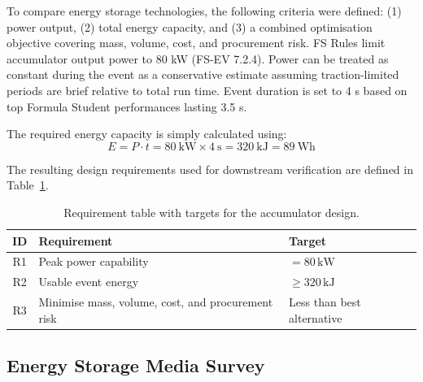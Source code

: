 To compare energy storage technologies, the following criteria were defined: (1) power output, (2) total energy capacity, and (3) a combined optimisation objective covering mass, volume, cost, and procurement risk.
FS Rules limit accumulator output power to 80 kW (FS-EV 7.2.4). Power can be treated as constant during the event as a conservative estimate assuming traction-limited periods are brief relative to total run time. Event duration is set to 4 s based on top Formula Student performances lasting 3.5 s.

The required energy capacity is simply calculated using:
\begin{equation*}
E = P \cdot t = 80~\text{kW} \times 4~\text{s} = 320~\text{kJ} = 89~\text{Wh}
\end{equation*}

The resulting design requirements used for downstream verification are defined in Table~\ref{tab:design_requirement_ids}.

\begin{table}[htbp]
    \centering
    \caption{Requirement table with targets for the accumulator design.}
    \label{tab:design_requirement_ids}
    \footnotesize
    \begin{tabular}{|c|l|l|}
        \hline
        \textbf{ID} & \textbf{Requirement} & \textbf{Target} \\
        \hline
        R1 & Peak power capability & $= 80\,\text{kW}$ \\
        R2 & Usable event energy & $\geq 320\,\text{kJ}$\\
        R3 & Minimise mass, volume, cost, and procurement risk & Less than best alternative \\
        \hline
    \end{tabular}
\end{table}

\subsection{Energy Storage Media Survey}

